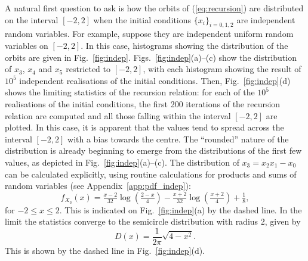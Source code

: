 \documentclass[nofootinbib,prb,amsmath,amssymb,twocolumn,floatfix]{revtex4-2}
\theoremstyle{definition}
\begin{document}
A natural first question to ask is how the orbits of (\ref{eq:recursion}) are distributed on the interval $[-2,2]$ when the initial conditions $\{x_i\}_{i=0,1,2}$ are independent random variables. For example, suppose they are independent uniform random variables on $[-2,2]$. In this case, histograms showing the distribution of the orbits are given in Fig.~\ref{fig:indep}. Figs.~\ref{fig:indep}(a)--(c) show the distribution of $x_3$, $x_4$ and $x_5$ restricted to $[-2,2]$, with each histogram showing the result of $10^5$ independent realisations of the initial conditions. Then, Fig.~\ref{fig:indep}(d) shows the limiting statistics of the recursion relation: for each of the $10^5$ realisations of the initial conditions, the first 200 iterations of the recursion relation are computed and all those falling within the interval $[-2,2]$ are plotted. In this case, it is apparent that the values tend to spread across the interval $[-2,2]$ with a bias towards the centre. The ``rounded'' nature of the distribution is already beginning to emerge from the distributions of the first few values, as depicted in Fig.~\ref{fig:indep}(a)--(c). The distribution of $x_3=x_2x_1-x_0$ can be calculated explicitly, using routine calculations for products and sums of random variables (see Appendix~\ref{app:pdf_indep}):
\begin{equation} \label{eq:indepdist}
	f_{X_3}(x)= \tfrac{x-2}{32}\log\left(\tfrac{2-x}{4}\right) - \tfrac{x+2}{32}\log\left(\tfrac{x+2}{4}\right) + \tfrac{1}{8},
\end{equation}
for $-2\leq x\leq2$. This is indicated on Fig.~\ref{fig:indep}(a) by the dashed line. In the limit the statistics converge to the semicircle distribution with radius 2, given by
\begin{equation} \label{dist:semicircle}
	D(x)=\frac{1}{2\pi} \sqrt{4-x^2}.
\end{equation}
This is shown by the dashed line in Fig.~\ref{fig:indep}(d). 
\end{document}
